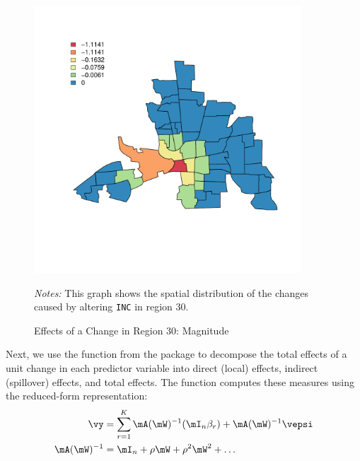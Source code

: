 \documentclass[english,12pt]{book}\usepackage[]{graphicx}\usepackage[]{xcolor}
\newenvironment{knitrout}{}{} %
\begin{document}
\begin{figure}[ht]
  \caption{Effects of a Change in Region 30: Magnitude}
    \label{fig:predicted-effect2}
        \centering 
	\begin{minipage}{.9\linewidth}
\begin{knitrout}
\color{fgcolor}

{\centering \includegraphics[width=10cm,height=10cm]{figure/predicted-effect2-1} 

}


\end{knitrout}
\footnotesize
		\emph{Notes:} This graph shows the spatial distribution of the changes caused by altering \texttt{INC} in region 30.
	\end{minipage}
\end{figure}


Next, we use the  function from the  package to decompose the total effects of a unit change in each predictor variable into direct (local) effects, indirect (spillover) effects, and total effects. The  function computes these measures using the reduced-form representation:
\begin{equation*}
  \begin{aligned}
    \vy & = \sum_{r = 1}^K \mA(\mW)^{-1}(\mI_n\beta_r) + \mA(\mW)^{-1}\vepsi \\
     \mA(\mW)^{-1} & = \mI_n + \rho\mW + \rho^2\mW^2 + \ldots
  \end{aligned}
\end{equation*}
\end{document}
